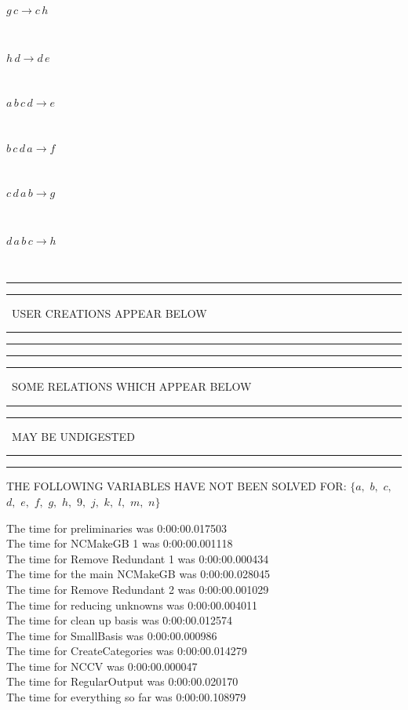 \documentclass[rep10,leqno]{report}
\begin{document}
\begin{minipage}{6in}
$
g\,
 c\rightarrow c\,
 h
$
\end{minipage}\medskip \\
\begin{minipage}{6in}
$
h\,
 d\rightarrow d\,
 e
$
\end{minipage}\medskip \\
\begin{minipage}{6in}
$
a\,
 b\,
 c\,
 d\rightarrow e
$
\end{minipage}\medskip \\
\begin{minipage}{6in}
$
b\,
 c\,
 d\,
 a\rightarrow f
$
\end{minipage}\medskip \\
\begin{minipage}{6in}
$
c\,
 d\,
 a\,
 b\rightarrow g
$
\end{minipage}\medskip \\
\begin{minipage}{6in}
$
d\,
 a\,
 b\,
 c\rightarrow h
$
\end{minipage}\\
\rule[2pt]{6in}{1pt}\hfil\break
\rule[2.5pt]{1.701in}{1pt}
\ USER CREATIONS APPEAR BELOW\ 
\rule[2.5pt]{1.701in}{1pt}\hfil\break
\rule[2pt]{6in}{1pt}\hfil\break
\rule[2pt]{6in}{4pt}\hfil\break
\rule[2pt]{1.45in}{4pt}
\ SOME RELATIONS WHICH APPEAR BELOW\ 
\rule[2pt]{1.45in}{4pt}\hfil\break
\rule[2pt]{2.18in}{4pt}
\ MAY BE UNDIGESTED\ 
\rule[2pt]{2.18in}{4pt}\hfil\break
\rule[2pt]{6in}{4pt}\hfil\break
THE FOLLOWING VARIABLES HAVE NOT BEEN SOLVED FOR:\hfil\break
$\{a,
$ $
b,
$ $
c,
$ $
d,
$ $
e,
$ $
f,
$ $
g,
$ $
h,
$ $
9,
$ $
j,
$ $
k,
$ $
l,
$ $
m,
$ $
n\}$
\smallskip\\
\vspace{10pt}

\noindent
The time for preliminaries was 0:00:00.017503\\
The time for NCMakeGB 1 was 0:00:00.001118\\
The time for Remove Redundant 1 was 0:00:00.000434\\
The time for the main NCMakeGB was 0:00:00.028045\\
The time for Remove Redundant 2 was 0:00:00.001029\\
The time for reducing unknowns was 0:00:00.004011\\
The time for clean up basis was 0:00:00.012574\\
The time for SmallBasis was 0:00:00.000986\\
The time for CreateCategories was 0:00:00.014279\\
The time for NCCV was 0:00:00.000047\\
The time for RegularOutput was 0:00:00.020170\\
The time for everything so far was 0:00:00.108979\\
\end{document}
